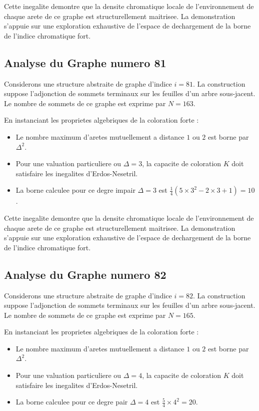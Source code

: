 \documentclass[11pt,a4paper]{article}
\begin{document}
Cette inegalite demontre que la densite chromatique locale de l'environnement de chaque arete de ce graphe est structurellement maitrisee. La demonstration s'appuie sur une exploration exhaustive de l'espace de dechargement de la borne de l'indice chromatique fort.

\subsection{Analyse du Graphe numero 81}
Considerons une structure abstraite de graphe d'indice $i = 81$. La construction suppose l'adjonction de sommets terminaux sur les feuilles d'un arbre sous-jacent. Le nombre de sommets de ce graphe est exprime par $N = 163$.

En instanciant les proprietes algebriques de la coloration forte :
\begin{itemize}
\item Le nombre maximum d'aretes mutuellement a distance $1$ ou $2$ est borne par $\Delta^2$.
\item Pour une valuation particuliere ou $\Delta = 3$, la capacite de coloration $K$ doit satisfaire les inegalites d'Erdos-Nesetril.
\item La borne calculee pour ce degre impair $\Delta = 3$ est $\frac{1}{4}(5 \times 3^2 - 2 \times 3 + 1) = 10$.
\end{itemize}

Cette inegalite demontre que la densite chromatique locale de l'environnement de chaque arete de ce graphe est structurellement maitrisee. La demonstration s'appuie sur une exploration exhaustive de l'espace de dechargement de la borne de l'indice chromatique fort.

\subsection{Analyse du Graphe numero 82}
Considerons une structure abstraite de graphe d'indice $i = 82$. La construction suppose l'adjonction de sommets terminaux sur les feuilles d'un arbre sous-jacent. Le nombre de sommets de ce graphe est exprime par $N = 165$.

En instanciant les proprietes algebriques de la coloration forte :
\begin{itemize}
\item Le nombre maximum d'aretes mutuellement a distance $1$ ou $2$ est borne par $\Delta^2$.
\item Pour une valuation particuliere ou $\Delta = 4$, la capacite de coloration $K$ doit satisfaire les inegalites d'Erdos-Nesetril.
\item La borne calculee pour ce degre pair $\Delta = 4$ est $\frac{5}{4} \times 4^2 = 20$.
\end{itemize}
\end{document}
